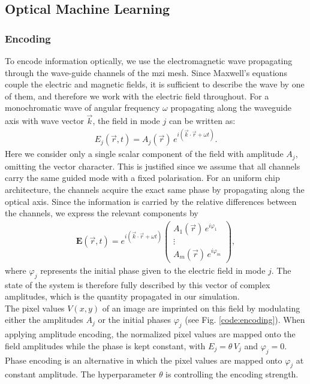 \subsection{Optical Machine Learning}
\subsubsection{Encoding}
To encode information optically, we use the electromagnetic wave propagating through the wave-guide channels of the \gls{mzi} mesh. 
Since Maxwell's equations couple the electric and magnetic fields, it is sufficient to describe the wave by one of them, and therefore we work with the electric field throughout. 
For a monochromatic wave of angular frequency $\omega$ propagating along the waveguide axis with wave vector $\vec{k}$, the field in mode $j$ can be written as:
\begin{align*}
    E_j(\vec r, t) = A_j(\vec r)\, e^{i(\vec k \cdot \vec r + \omega t)}.
\end{align*}
Here we consider only a single scalar component of the field with amplitude $A_j$, omitting the vector character.
This is justified since we assume that all channels carry the same guided mode with a fixed polarisation.
For an uniform chip architecture, the channels acquire the exact same phase by propagating along the optical axis. Since the information is carried by the relative differences between the channels, we express the relevant components by 
\begin{align*}
    \mathbf{E}(\vec{r}, t) = e^{i(\vec{k} \cdot \vec{r} +\omega t)}
    \begin{pmatrix}
        A_1(\vec r)\, e^{i\varphi_1} \\ \vdots \\ A_m(\vec r)\, e^{i\varphi_m}
    \end{pmatrix},
\end{align*}
where $\varphi_j$ represents the initial phase given to the electric field in mode $j$.
The state of the system is therefore fully described by this vector of complex amplitudes, which is the quantity propagated in our simulation.
\\
The pixel values $V(x,y)$ of an image are imprinted on this field by modulating either the amplitudes $A_j$ or the initial phases $\varphi_j$ (see Fig. \ref{code:encoding}).
When applying amplitude encoding, the normalized pixel values are mapped onto the field
amplitudes while the phase is kept constant, with $E_j = \theta \, V_j$ and $\varphi_j = 0$.
Phase encoding is an alternative in which the pixel values are mapped onto $\varphi_j$ at constant amplitude.
The hyperparameter $\theta$ is controlling the encoding strength.

